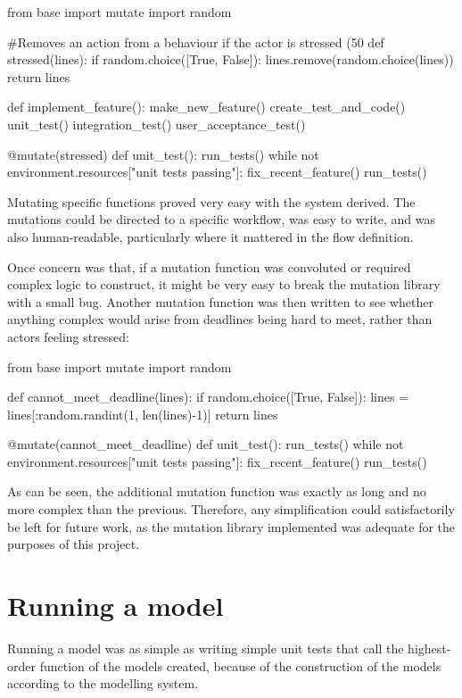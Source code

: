 \begin{pyglist}[language = python, encoding = utf8]
from base import mutate
import random

#Removes an action from a behaviour if the actor is stressed (50%
def stressed(lines):
    if random.choice([True, False]):
        lines.remove(random.choice(lines))
    return lines
    

def implement_feature():
    make_new_feature()
    create_test_and_code()
    unit_test()
    integration_test()
    user_acceptance_test()

@mutate(stressed)
def unit_test():
    run_tests()
    while not environment.resources["unit tests passing"]:
        fix_recent_feature()
        run_tests()
\end{pyglist}\par
Mutating specific functions proved very easy with the system derived. The mutations could be directed to a specific workflow, was easy to write, and was also human-readable, particularly where it mattered in the flow definition.\par

Once concern was that, if a mutation function was convoluted or required complex logic to construct, it might be very easy to break the mutation library with a small bug. Another mutation function was then written to see whether anything complex would arise from deadlines being hard to meet, rather than actors feeling stressed:

\begin{pyglist}[language = python, encoding = utf8]
from base import mutate
import random

def cannot_meet_deadline(lines):
    if random.choice([True, False]):
        lines = lines[:random.randint(1, len(lines)-1)]
    return lines

@mutate(cannot_meet_deadline)
def unit_test():
    run_tests()
    while not environment.resources["unit tests passing"]:
        fix_recent_feature()
        run_tests()
\end{pyglist}\par
As can be seen, the additional mutation function was exactly as long and no more complex than the previous. Therefore, any simplification could satisfactorily be left for future work, as the mutation library implemented was adequate for the purposes of this project.\par

\section{Running a model}
Running a model was as simple as writing simple unit tests that call the highest-order function of the models created, because of the construction of the models according to the modelling system. \par

